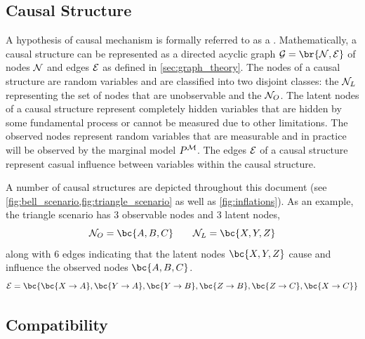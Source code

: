\documentclass[aps, 10pt, english, twoside, pra, nofootinbib, tightenlines, longbibliography]{revtex4-1}
\begin{document}
    \subsection{Causal Structure}
    A hypothesis of causal mechanism is formally referred to as  a . Mathematically, a causal structure can be represented as a directed acyclic graph $\graph = \br{\nodes, \edges}$ of nodes $\mathcal{N}$ and edges $\mathcal{E}$ as defined in \cref{sec:graph_theory}. The nodes of a causal structure are random variables and are classified into two disjoint classes: the  $\mathcal{N}_L$ representing the set of nodes that are unobservable and the  $\mathcal{N}_O$. The latent nodes of a causal structure represent completely hidden variables that are hidden by some fundamental process or cannot be measured due to other limitations. The observed nodes represent random variables that are measurable and in practice will be observed by the marginal model $\prob^\mscenario$. The edges $\mathcal{E}$ of a causal structure represent casual influence between variables within the causal structure.

    A number of causal structures are depicted throughout this document (see \cref{fig:bell_scenario,fig:triangle_scenario} as well as \cref{fig:inflations}). As an example, the triangle scenario has $3$ observable nodes and $3$ latent nodes,
    \[ \nodes_{O} = \bc{A, B, C} \qquad \nodes_{L} = \bc{X, Y, Z} \]
    along with $6$ edges indicating that the latent nodes $\bc{X, Y, Z}$ cause and influence the observed nodes $\bc{A, B, C}$.
    \[ \edges = \bc{\bc{X \to A}, \bc{Y \to A}, \bc{Y \to B}, \bc{Z \to B}, \bc{Z \to C}, \bc{X \to C}} \]

    \subsection{Compatibility}
    \label{sec:compatibility}
\end{document}
